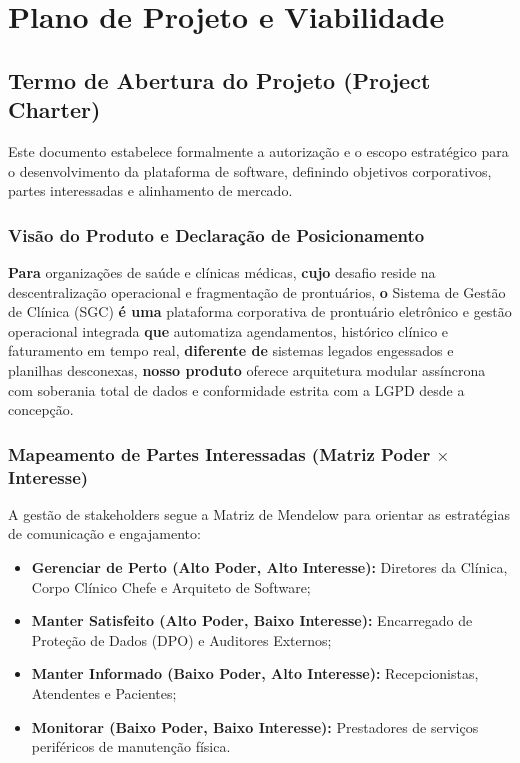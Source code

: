 \chapter{Plano de Projeto e Viabilidade}
\label{chap:plano_projeto}

\section{Termo de Abertura do Projeto (Project Charter)}
Este documento estabelece formalmente a autorização e o escopo estratégico para o desenvolvimento da plataforma de software, definindo objetivos corporativos, partes interessadas e alinhamento de mercado.

\subsection{Visão do Produto e Declaração de Posicionamento}
\textbf{Para} organizações de saúde e clínicas médicas, \textbf{cujo} desafio reside na descentralização operacional e fragmentação de prontuários, \textbf{o} Sistema de Gestão de Clínica (SGC) \textbf{é uma} plataforma corporativa de prontuário eletrônico e gestão operacional integrada \textbf{que} automatiza agendamentos, histórico clínico e faturamento em tempo real, \textbf{diferente de} sistemas legados engessados e planilhas desconexas, \textbf{nosso produto} oferece arquitetura modular assíncrona com soberania total de dados e conformidade estrita com a LGPD desde a concepção.

\subsection{Mapeamento de Partes Interessadas (Matriz Poder $\times$ Interesse)}
A gestão de stakeholders segue a Matriz de Mendelow para orientar as estratégias de comunicação e engajamento:
\begin{itemize}
    \item \textbf{Gerenciar de Perto (Alto Poder, Alto Interesse):} Diretores da Clínica, Corpo Clínico Chefe e Arquiteto de Software;
    \item \textbf{Manter Satisfeito (Alto Poder, Baixo Interesse):} Encarregado de Proteção de Dados (DPO) e Auditores Externos;
    \item \textbf{Manter Informado (Baixo Poder, Alto Interesse):} Recepcionistas, Atendentes e Pacientes;
    \item \textbf{Monitorar (Baixo Poder, Baixo Interesse):} Prestadores de serviços periféricos de manutenção física.
\end{itemize}

